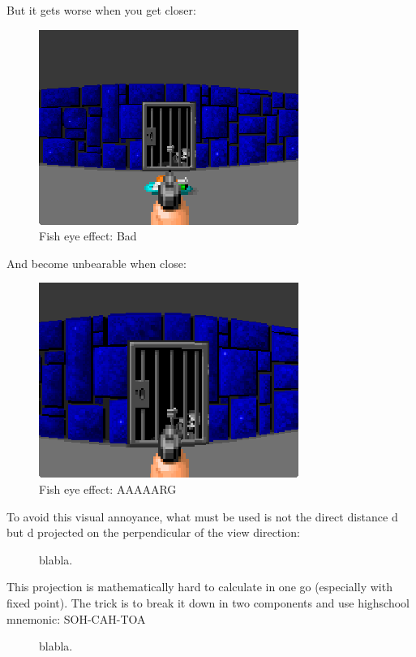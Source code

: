 But it gets worse when you get closer:
\begin{figure}[H]
\centering
 \includegraphics[scale=1.3]{imgs/fish_eye/bad_ok.png}
 \caption{Fish eye effect: Bad} \label{fig:mips}
 \end{figure}

And become unbearable when close:
 \begin{figure}[H]
\centering
 \includegraphics[scale=1.3]{imgs/fish_eye/bad_bad.png}
 \caption{Fish eye effect: AAAAARG} \label{fig:mips}
 \end{figure}
 
To avoid this visual annoyance, what must be used is not the direct distance d but d projected on the perpendicular of the view direction:

\begin{figure}[H]
\centering
 
 \caption{blabla.} \label{fig:Raycasting2}
\end{figure}

This projection is mathematically hard to calculate in one go (especially with fixed point). The trick is to break it down in two components and use highschool mnemonic: SOH-CAH-TOA\\

\begin{figure}[H]
\centering
 
 \caption{blabla.} \label{fig:Raycasting2}
\end{figure}


